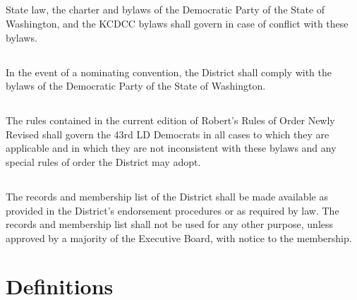 \subsection{}
State law, the charter and bylaws of the Democratic Party of the State of Washington, and the KCDCC bylaws shall govern in case of conflict with these bylaws.

\subsection{}
In the event of a nominating convention, the \fortythird{} District shall comply with the bylaws of the Democratic Party of the State of Washington.

\subsection{}
The rules contained in the current edition of Robert’s Rules of Order Newly Revised shall govern the 43rd LD Democrats in all cases to which they are applicable and in which they are not inconsistent with these bylaws and any special rules of order the \fortythird{} District may adopt.

\subsection{}
The records and membership list of the \fortythird{} District shall be made available as provided in the \fortythird{} District’s endorsement procedures or as required by law. The records and membership list shall not be used for any other purpose, unless approved by a majority of the Executive Board, with notice to the membership.

\section{Definitions} \label{defs}
